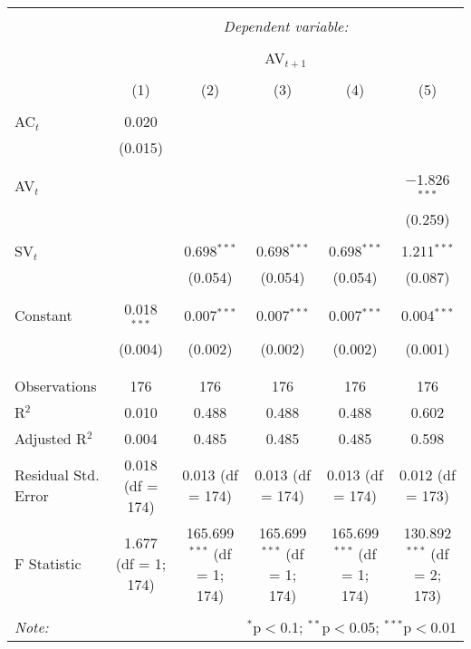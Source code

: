 
\begin{table}[!htbp] \centering 
  \caption{} 
  \label{} 
\begin{tabular}{@{\extracolsep{5pt}}lccccc} 
\\[-1.8ex]\hline 
\hline \\[-1.8ex] 
 & \multicolumn{5}{c}{\textit{Dependent variable:}} \\ 
\cline{2-6} 
\\[-1.8ex] & \multicolumn{5}{c}{AV$_{t+1}$} \\ 
\\[-1.8ex] & (1) & (2) & (3) & (4) & (5)\\ 
\hline \\[-1.8ex] 
 AC$_{t}$ & 0.020 &  &  &  &  \\ 
  & (0.015) &  &  &  &  \\ 
  & & & & & \\ 
 AV$_{t}$ &  &  &  &  & $-$1.826$^{***}$ \\ 
  &  &  &  &  & (0.259) \\ 
  & & & & & \\ 
 SV$_{t}$ &  & 0.698$^{***}$ & 0.698$^{***}$ & 0.698$^{***}$ & 1.211$^{***}$ \\ 
  &  & (0.054) & (0.054) & (0.054) & (0.087) \\ 
  & & & & & \\ 
 Constant & 0.018$^{***}$ & 0.007$^{***}$ & 0.007$^{***}$ & 0.007$^{***}$ & 0.004$^{***}$ \\ 
  & (0.004) & (0.002) & (0.002) & (0.002) & (0.001) \\ 
  & & & & & \\ 
\hline \\[-1.8ex] 
Observations & 176 & 176 & 176 & 176 & 176 \\ 
R$^{2}$ & 0.010 & 0.488 & 0.488 & 0.488 & 0.602 \\ 
Adjusted R$^{2}$ & 0.004 & 0.485 & 0.485 & 0.485 & 0.598 \\ 
Residual Std. Error & 0.018 (df = 174) & 0.013 (df = 174) & 0.013 (df = 174) & 0.013 (df = 174) & 0.012 (df = 173) \\ 
F Statistic & 1.677 (df = 1; 174) & 165.699$^{***}$ (df = 1; 174) & 165.699$^{***}$ (df = 1; 174) & 165.699$^{***}$ (df = 1; 174) & 130.892$^{***}$ (df = 2; 173) \\ 
\hline 
\hline \\[-1.8ex] 
\textit{Note:}  & \multicolumn{5}{r}{$^{*}$p$<$0.1; $^{**}$p$<$0.05; $^{***}$p$<$0.01} \\ 
\end{tabular} 
\end{table} 
